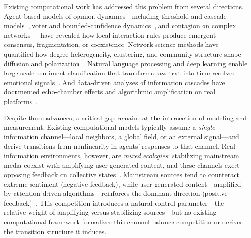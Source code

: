 \documentclass[12pt]{article}
\begin{document}
Existing computational work has addressed this problem from several directions. Agent-based models of opinion dynamics---including threshold and cascade models~\cite{Granovetter1978,CentolaMacy2007,WattsDodds2007,Nyborg2016}, voter and bounded-confidence dynamics~\cite{HolleyLiggett1975,SoodRedner2005,Deffuant2000,HegselmannKrause2002}, and contagion on complex networks~\cite{Centola2010,Centola2018Tipping,Iacopini2019,PastorSatorras2015}---have revealed how local interaction rules produce emergent consensus, fragmentation, or coexistence. Network-science methods have quantified how degree heterogeneity, clustering, and community structure shape diffusion and polarization~\cite{Watts2002,Dandekar2013,McPherson2001}. Natural language processing and deep learning enable large-scale sentiment classification that transforms raw text into time-resolved emotional signals~\cite{Brady2023,Kramer2014,Fan2014}. And data-driven analyses of information cascades have documented echo-chamber effects and algorithmic amplification on real platforms~\cite{Bakshy2015,DelVicario2016SciRep,DelVicario2016PNAS,Vosoughi2018,Cinelli2021}.

Despite these advances, a critical gap remains at the intersection of modeling and measurement. Existing computational models typically assume a \emph{single} information channel---local neighbors, a global field, or an external signal---and derive transitions from nonlinearity in agents' responses to that channel. Real information environments, however, are \emph{mixed ecologies}: stabilizing mainstream media coexist with amplifying user-generated content, and these channels exert opposing feedback on collective states~\cite{Chadwick2017,Tornberg2022,Piao2023}. Mainstream sources tend to counteract extreme sentiment (negative feedback), while user-generated content---amplified by attention-driven algorithms---reinforces the dominant direction (positive feedback)~\cite{DelVicario2016SciRep,Vosoughi2018}. This competition introduces a natural control parameter---the relative weight of amplifying versus stabilizing sources---but no existing computational framework formalizes this channel-balance competition or derives the transition structure it induces.
\end{document}
